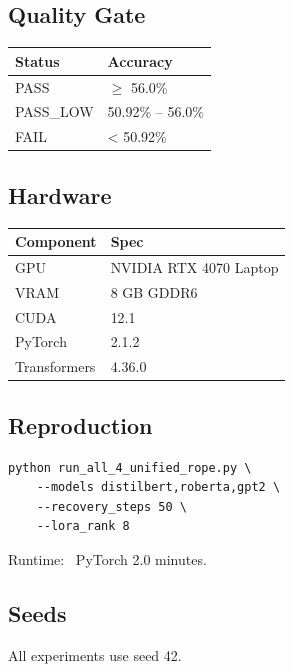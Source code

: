 {\begin{itemize}
\end{itemize}
\subsection{Quality Gate}

\begin{table}[H]
\centering
\small
\begin{tabular}{ll}
\toprule
\textbf{Status} & \textbf{Accuracy} \\
\midrule
PASS & $\ge$ 56.0\% \\
PASS\_LOW & 50.92\% -- 56.0\% \\
FAIL & < 50.92\% \\
\bottomrule
\end{tabular}
\end{table}

\subsection{Hardware}

\begin{table}[H]
\centering
\small
\begin{tabular}{ll}
\toprule
\textbf{Component} & \textbf{Spec} \\
\midrule
GPU & NVIDIA RTX 4070 Laptop \\
VRAM & 8 GB GDDR6 \\
CUDA & 12.1 \\
PyTorch & 2.1.2 \\
Transformers & 4.36.0 \\
\bottomrule
\end{tabular}
\end{table}

\subsection{Reproduction}

\begin{lstlisting}
python run_all_4_unified_rope.py \
    --models distilbert,roberta,gpt2 \
    --recovery_steps 50 \
    --lora_rank 8
\end{lstlisting}

Runtime: ~PyTorch 2.0 minutes.

\subsection{Seeds}

All experiments use seed 42.

}
